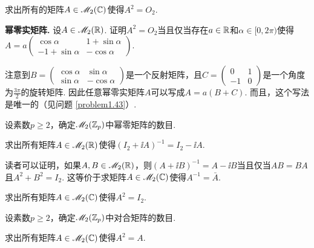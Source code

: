 \begin{problem}
  求出所有的矩阵$A\in\mathscr M_2(\mathbb C)$使得$A^2=O_2$.
\end{problem}

\begin{problem}
  {\bfseries 幂零实矩阵.}  设$A\in\mathscr M_2(\mathbb R)$. 证明$A^2=O_2$当且仅当存在$a\in\mathbb R$和$\alpha\in[0,2\pi)$使得$A=a\begin{pmatrix}
    \cos\alpha & 1+\sin\alpha \\
    -1+\sin\alpha & -\cos\alpha
  \end{pmatrix}$.

  注意到$B=\begin{pmatrix}
    \cos\alpha & \sin\alpha \\
    \sin\alpha & -\cos\alpha
  \end{pmatrix}$是一个反射矩阵，且$C=\begin{pmatrix}
    0 & 1 \\
    -1 & 0
  \end{pmatrix}$是一个角度为$\frac{3\pi}2$的旋转矩阵. 因此任意幂零实矩阵$A$可以写成$A=a(B+C)$. 而且，这个写法是唯一的（见问题 \ref{problem1.43}）.
\end{problem}

\begin{mybox}
  \begin{problem}
    设素数$p\ge2$，确定$\mathscr M_2(\mathbb Z_p)$中幂零矩阵的数目.
  \end{problem}
\end{mybox}

\begin{problem}
  求出所有矩阵$A\in\mathscr M_2(\mathbb R)$使得$(I_2+\ii A)^{-1}=I_2-\ii A$.
\end{problem}
\begin{remark}
  读者可以证明，如果$A,B\in\mathscr M_2(\mathbb R)$，则$(A+\ii B)^{-1}=A-\ii B$当且仅当$AB=BA$且$A^2+B^2=I_2$. 这等价于求矩阵$A\in\mathscr M_2(\mathbb C)$使得$A^{-1}=\bar A$.
\end{remark}

\begin{problem}
  求出所有矩阵$A\in\mathscr M_2(\mathbb C)$使得$A^2=I_2$.
\end{problem}

\begin{mybox}
  \begin{problem}
    设素数$p\ge2$，确定$\mathscr M_2(\mathbb Z_p)$中对合矩阵的数目.
  \end{problem}
\end{mybox}

\begin{problem}
  求出所有矩阵$A\in\mathscr M_2(\mathbb C)$使得$A^2=A$.
\end{problem}

